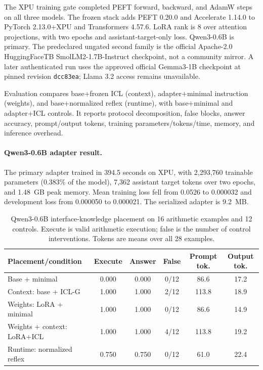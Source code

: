 \documentclass[11pt]{article}
\begin{document}
The XPU training gate completed PEFT forward, backward, and AdamW steps on all three
models. The frozen stack adds PEFT 0.20.0 and Accelerate 1.14.0 to PyTorch
2.13.0+XPU and Transformers 4.57.6. LoRA rank is 8 over attention projections,
with two epochs and assistant-target-only loss. Qwen3-0.6B is primary. The
predeclared ungated second family is the official Apache-2.0 HuggingFaceTB
SmolLM2-1.7B-Instruct checkpoint, not a community mirror. A later authenticated
run uses the approved official Gemma3-1B checkpoint at pinned revision
\texttt{dcc83ea}; Llama 3.2 access remains unavailable.

Evaluation compares base+frozen ICL (context), adapter+minimal instruction
(weights), and base+normalized reflex (runtime), with base+minimal and
adapter+ICL controls. It reports protocol decomposition, false blocks, answer
accuracy, prompt/output tokens, training parameters/tokens/time, memory, and
inference overhead.

\paragraph{Qwen3-0.6B adapter result.}
The primary adapter trained in 394.5 seconds on XPU, with 2,293,760 trainable
parameters (0.383\% of the model), 7,362 assistant target tokens over two epochs,
and 1.48~GB peak memory. Mean training loss fell from 0.0526 to 0.000032 and
development loss from 0.000050 to 0.000021. The serialized adapter is 9.2~MB.

\begin{table}[t]
\centering
\small
\caption{Qwen3-0.6B interface-knowledge placement on 16 arithmetic examples and
12 controls. Execute is valid arithmetic execution; false is the number of
control interventions. Tokens are means over all 28 examples.}
\label{tab:qwen-placement}
\begin{tabular}{@{}lccccc@{}}
\toprule
Placement/condition & Execute & Answer & False & Prompt tok. & Output tok. \\
\midrule
Base + minimal              & 0.000 & 0.000 & 0/12 & 86.6  & 17.2 \\
Context: base + ICL-G       & 1.000 & 1.000 & 2/12 & 113.8 & 18.9 \\
Weights: LoRA + minimal     & 1.000 & 1.000 & 0/12 & 86.6  & 14.9 \\
Weights + context: LoRA+ICL & 1.000 & 1.000 & 4/12 & 113.8 & 19.2 \\
Runtime: normalized reflex  & 0.750 & 0.750 & 0/12 & 61.0  & 22.4 \\
\bottomrule
\end{tabular}
\end{table}
\end{document}
